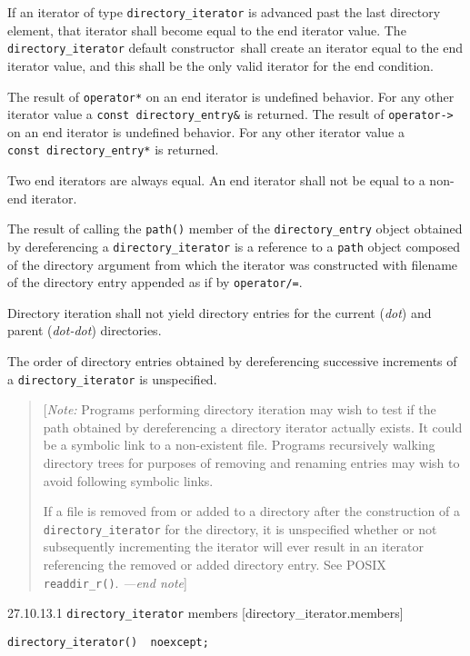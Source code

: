 If an iterator of type \texttt{directory\_iterator} is advanced past the
last directory element, that iterator shall become equal to the end
iterator value. The \texttt{directory\_iterator} default
constructor~shall create an iterator equal to the end iterator value,
and this shall be the only valid iterator for the end condition.

The result of \texttt{operator*} on an end iterator is undefined
behavior. For any other iterator value a
\texttt{const\ directory\_entry\&} is returned. The result of
\texttt{operator-\textgreater{}} on an end iterator is undefined
behavior. For any other iterator value a
\texttt{const\ directory\_entry*} is returned.

Two end iterators are always equal. An end iterator shall not be equal
to a non-end iterator.

The result of calling the \texttt{path()} member of the
\texttt{directory\_entry} object obtained by dereferencing a
\texttt{directory\_iterator} is a reference to a \texttt{path} object
composed of the directory argument from which the iterator was
constructed with filename of the directory entry appended as if by
\texttt{operator/=}.

Directory iteration shall not yield directory entries for the current
(\emph{dot}) and parent (\emph{dot-dot}) directories.

The order of directory entries obtained by dereferencing successive
increments of a \texttt{directory\_iterator} is unspecified.

\begin{quote}
{[}\emph{Note:} Programs performing directory iteration may wish to test
if the path obtained by dereferencing a directory iterator actually
exists. It could be a symbolic link to a non-existent file. Programs
recursively walking directory trees for purposes of removing and
renaming entries may wish to avoid following symbolic links.

If a file is removed from or added to a directory after the construction
of a \texttt{directory\_iterator} for the directory, it is unspecified
whether or not subsequently incrementing the iterator will ever result
in an iterator referencing the removed or added directory entry. See
POSIX \texttt{readdir\_r()}. \emph{---end note}{]}
\end{quote}

27.10.13.1 \texttt{directory\_iterator} members
{[}directory\_iterator.members{]}

\texttt{directory\_iterator()\ \ noexcept;}

